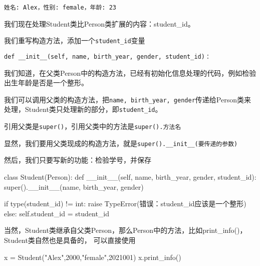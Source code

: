 \documentclass[
  letterpaper,
  DIV=11,
  numbers=noendperiod]{scrreprt}
\newenvironment{Shaded}{\begin{snugshade}}{\end{snugshade}}
\newcommand{\BuiltInTok}[1]{\textcolor[rgb]{0.00,0.23,0.31}{#1}}
\newcommand{\ControlFlowTok}[1]{\textcolor[rgb]{0.00,0.23,0.31}{#1}}
\newcommand{\DecValTok}[1]{\textcolor[rgb]{0.68,0.00,0.00}{#1}}
\newcommand{\FunctionTok}[1]{\textcolor[rgb]{0.28,0.35,0.67}{#1}}
\newcommand{\KeywordTok}[1]{\textcolor[rgb]{0.00,0.23,0.31}{#1}}
\newcommand{\NormalTok}[1]{\textcolor[rgb]{0.00,0.23,0.31}{#1}}
\newcommand{\OperatorTok}[1]{\textcolor[rgb]{0.37,0.37,0.37}{#1}}
\newcommand{\PreprocessorTok}[1]{\textcolor[rgb]{0.68,0.00,0.00}{#1}}
\newcommand{\StringTok}[1]{\textcolor[rgb]{0.13,0.47,0.30}{#1}}
\newcommand{\VariableTok}[1]{\textcolor[rgb]{0.07,0.07,0.07}{#1}}
\begin{document}
\begin{verbatim}
姓名: Alex，性别: female，年龄: 23
\end{verbatim}

我们现在处理Student类比Person类扩展的内容：student\_id。

我们重写构造方法，添加一个\texttt{student\_id}变量

\begin{verbatim}
def __init__(self, name, birth_year, gender, student_id)：
\end{verbatim}

我们知道，在父类Person中的构造方法，已经有初始化信息处理的代码，例如检验出生年龄是否是一个整形。

我们可以调用父类的构造方法，把\texttt{name,\ birth\_year,\ gender}传递给Person类来处理，Student类只处理新的部分，即\texttt{student\_id}。

引用父类是\texttt{super()}，引用父类中的方法是\texttt{super().方法名}

显然，我们要用父类现成的构造方法，就是\texttt{super().\_\_init\_\_(要传递的参数)}

然后，我们只要写新的功能：检验学号，并保存

\begin{Shaded}
\begin{Highlighting}[]
\KeywordTok{class}\NormalTok{ Student(Person):}
    \KeywordTok{def} \FunctionTok{\_\_init\_\_}\NormalTok{(}\VariableTok{self}\NormalTok{, name, birth\_year, gender, student\_id):}
        \BuiltInTok{super}\NormalTok{().}\FunctionTok{\_\_init\_\_}\NormalTok{(name, birth\_year, gender)}
        
        \ControlFlowTok{if} \BuiltInTok{type}\NormalTok{(student\_id) }\OperatorTok{!=} \BuiltInTok{int}\NormalTok{:}
            \ControlFlowTok{raise} \PreprocessorTok{TypeError}\NormalTok{(}\StringTok{\textquotesingle{}错误：student\_id应该是一个整形\textquotesingle{}}\NormalTok{)}
        \ControlFlowTok{else}\NormalTok{:}
            \VariableTok{self}\NormalTok{.student\_id }\OperatorTok{=}\NormalTok{ student\_id}
\end{Highlighting}
\end{Shaded}

当然，Student类继承自父类Person，那么Person中的方法，比如print\_info()，Student类自然也是具备的，
可以直接使用

\begin{Shaded}
\begin{Highlighting}[]
\NormalTok{x }\OperatorTok{=}\NormalTok{ Student(}\StringTok{"Alex"}\NormalTok{,}\DecValTok{2000}\NormalTok{,}\StringTok{"female"}\NormalTok{,}\DecValTok{2021001}\NormalTok{)}
\NormalTok{x.print\_info()}
\end{Highlighting}
\end{Shaded}
\end{document}
